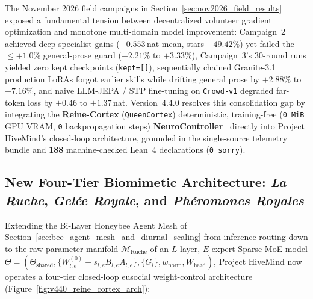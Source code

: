 \documentclass[11pt,a4paper]{article}
\begin{document}
The November 2026 field campaigns in Section~\ref{sec:nov2026_field_results} exposed a fundamental tension between decentralized volunteer gradient optimization and monotone multi-domain model improvement: Campaign~2 achieved deep specialist gains ($-0.553$\,nat mean, stars $-49.42\%$) yet failed the $\le +1.0\%$ general-prose guard ($+2.21\%$ to $+3.33\%$), Campaign~3's 30-round runs yielded zero kept checkpoints (\texttt{kept=[]}), sequentially chained Granite-3.1 production LoRAs forgot earlier skills while drifting general prose by $+2.88\%$ to $+7.16\%$, and naive LLM-JEPA / STP fine-tuning on \texttt{Crowd-v1} degraded far-token loss by $+0.46$ to $+1.37$\,nat. Version~4.4.0 resolves this consolidation gap by integrating the \textbf{Reine-Cortex} (\texttt{QueenCortex}) deterministic, training-free (\texttt{0\,MiB} GPU VRAM, \texttt{0} backpropagation steps) \textbf{NeuroController}~\cite{callens2026reinecortex} directly into Project HiveMind's closed-loop architecture, grounded in the single-source telemetry bundle  and \textbf{188} machine-checked Lean~4 declarations (\texttt{0 sorry}).

\subsection{New Four-Tier Biomimetic Architecture: \emph{La Ruche}, \emph{Gel\'ee Royale}, and \emph{Ph\'eromones Royales}}
\label{sec:v440_architecture_pheromones}

Extending the Bi-Layer Honeybee Agent Mesh of Section~\ref{sec:bee_agent_mesh_and_diurnal_scaling} from inference routing down to the raw parameter manifold $\mathcal{M}_{\mathrm{Ruche}}$ of an $L$-layer, $E$-expert Sparse MoE model $\Theta = (\Theta_{\mathrm{shared}}, \{W_{l,e}^{(0)} + s_{l,e} B_{l,e} A_{l,e}\}, \{G_l\}, w_{\mathrm{norm}}, W_{\mathrm{head}})$, Project HiveMind now operates a four-tier closed-loop eusocial weight-control architecture (Figure~\ref{fig:v440_reine_cortex_arch}):
\end{document}
